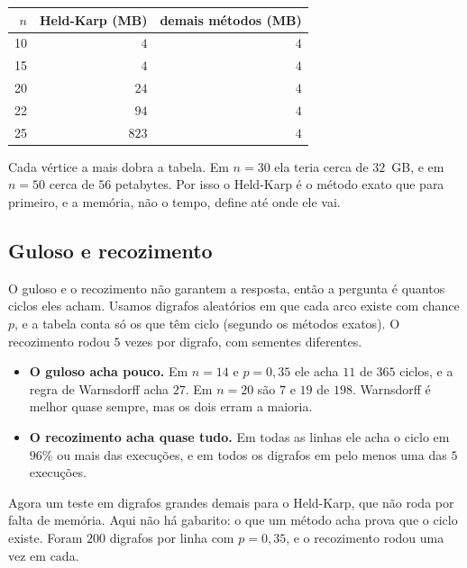 \documentclass[12pt,a4paper]{article}
\begin{document}
\begin{center}
\small
\begin{tabular}{r r r}
\toprule
$n$ & Held-Karp (MB) & demais métodos (MB)\\
\midrule
10 & $4$ & $4$\\
15 & $4$ & $4$\\
20 & $24$ & $4$\\
22 & $94$ & $4$\\
25 & $823$ & $4$\\
\bottomrule
\end{tabular}
\end{center}

Cada vértice a mais dobra a tabela. Em $n=30$ ela teria cerca de $32$~GB, e em $n=50$ cerca de $56$ petabytes. Por isso o Held-Karp é o método exato que para primeiro, e a memória, não o tempo, define até onde ele vai.

\subsection{Guloso e recozimento}

O guloso e o recozimento não garantem a resposta, então a pergunta é quantos ciclos eles acham. Usamos digrafos aleatórios em que cada arco existe com chance $p$, e a tabela conta só os que têm ciclo (segundo os métodos exatos). O recozimento rodou $5$ vezes por digrafo, com sementes diferentes.

\begin{center}
\small
\tabelaheuristicas
\end{center}

\begin{itemize}
  \item \textbf{O guloso acha pouco.} Em $n=14$ e $p=0{,}35$ ele acha $11$ de $365$ ciclos, e a regra de Warnsdorff acha $27$. Em $n=20$ são $7$ e $19$ de $198$. Warnsdorff é melhor quase sempre, mas os dois erram a maioria.
  \item \textbf{O recozimento acha quase tudo.} Em todas as linhas ele acha o ciclo em $96\%$ ou mais das execuções, e em todos os digrafos em pelo menos uma das $5$ execuções.
\end{itemize}

Agora um teste em digrafos grandes demais para o Held-Karp, que não roda por falta de memória. Aqui não há gabarito: o que um método acha prova que o ciclo existe. Foram $200$ digrafos por linha com $p=0{,}35$, e o recozimento rodou uma vez em cada.
\end{document}
